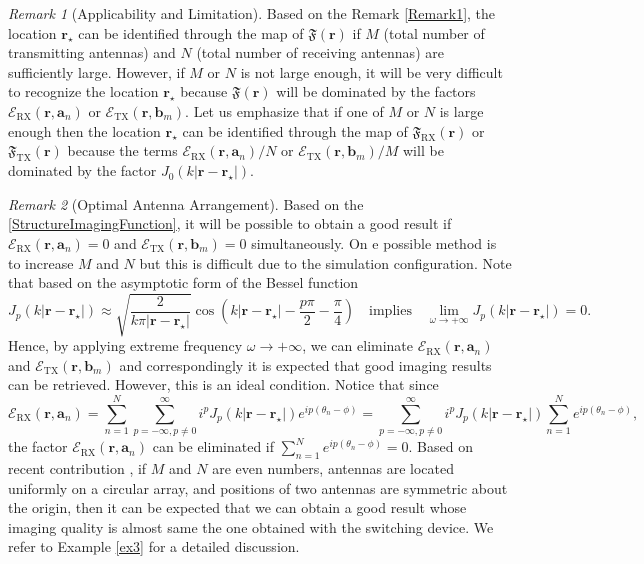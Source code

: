 \documentclass[3p,10pt]{elsarticle}
\newcommand{\ma}{\mathbf{a}}
\newcommand{\mb}{\mathbf{b}}
\newcommand{\mr}{\mathbf{r}}
\DeclareMathOperator*{\tx}{TX}
\DeclareMathOperator*{\rx}{RX}
\theoremstyle{plain}
\theoremstyle{remark}
\newtheorem{remark}{Remark}[section]
\begin{document}
\begin{remark}[Applicability and Limitation]\label{Remark2}
Based on the Remark \ref{Remark1}, the location $\mr_\star$ can be identified through the map of $\mathfrak{F}(\mr)$ if $M$ (total number of transmitting antennas) and $N$ (total number of receiving antennas) are sufficiently large. However, if $M$ or $N$ is not large enough, it will be very difficult to recognize the location $\mr_\star$ because $\mathfrak{F}(\mr)$ will be dominated by the factors $\mathcal{E}_{\rx}(\mr,\ma_n)$ or $\mathcal{E}_{\tx}(\mr,\mb_m)$. Let us emphasize that if one of $M$ or $N$ is large enough then the location $\mr_\star$ can be identified through the map of $\mathfrak{F}_{\rx}(\mr)$ or $\mathfrak{F}_{\tx}(\mr)$ because the terms $\mathcal{E}_{\rx}(\mr,\ma_n)/N$ or $\mathcal{E}_{\tx}(\mr,\mb_m)/M$ will be dominated by the factor $J_0(k|\mr-\mr_\star|)$.
\end{remark}

\begin{remark}[Optimal Antenna Arrangement]\label{Remark3}
Based on the \eqref{StructureImagingFunction}, it will be possible to obtain a good result if $\mathcal{E}_{\rx}(\mr,\ma_n)=0$ and $\mathcal{E}_{\tx}(\mr,\mb_m)=0$ simultaneously. On e possible method is to increase $M$ and $N$ but this is difficult due to the simulation configuration. Note that based on the asymptotic form of the Bessel function
\[J_p(k|\mr-\mr_\star|)\approx\sqrt{\frac{2}{k\pi|\mr-\mr_\star|}}\cos\left(k|\mr-\mr_\star|-\frac{p\pi}{2}-\frac{\pi}{4}\right)\quad\text{implies}\quad\lim_{\omega\to+\infty}J_p(k|\mr-\mr_\star|)=0.\]
Hence, by applying extreme frequency $\omega\longrightarrow+\infty$, we can eliminate $\mathcal{E}_{\rx}(\mr,\ma_n)$ and $\mathcal{E}_{\tx}(\mr,\mb_m)$ and correspondingly it is expected that good imaging results can be retrieved. However, this is an ideal condition. Notice that since
\[\mathcal{E}_{\rx}(\mr,\ma_n)=\sum_{n=1}^{N}\sum_{p=-\infty,p\ne0}^{\infty}i^pJ_p(k|\mr-\mr_\star|)e^{ip(\theta_n-\phi)}=\sum_{p=-\infty,p\ne0}^{\infty}i^pJ_p(k|\mr-\mr_\star|)\sum_{n=1}^{N}e^{ip(\theta_n-\phi)},\]
the factor $\mathcal{E}_{\rx}(\mr,\ma_n)$ can be eliminated if $\sum_{n=1}^{N}e^{ip(\theta_n-\phi)}=0$. Based on recent contribution \cite[Observation 4.4]{P-SUB16}, if $M$ and $N$ are even numbers, antennas are located uniformly on a circular array, and positions of two antennas are symmetric about the origin, then it can be expected that we can obtain a good result whose imaging quality is almost same the one obtained with the switching device. We refer to Example \ref{ex3} for a detailed discussion.
\end{remark}
\end{document}
